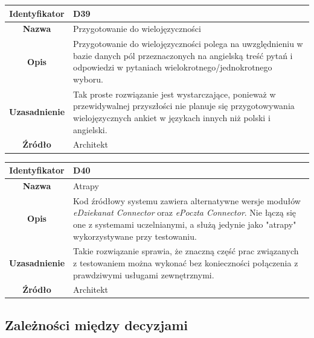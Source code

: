 \begin{table}[H]
\centering
\begin{tabular}{ | >{\bfseries}c | p{11cm} | }
\hline
%
Identyfikator & D39 \\ \hline
Nazwa & Przygotowanie do wielojęzyczności \\ \hline
Opis & Przygotowanie do wielojęzyczności polega na uwzględnieniu w bazie danych pól przeznaczonych na angielską treść pytań i odpowiedzi w pytaniach wielokrotnego/jednokrotnego wyboru. \\ \hline
Uzasadnienie & Tak proste rozwiązanie jest wystarczające, ponieważ w przewidywalnej przyszłości nie planuje się przygotowywania wielojęzycznych ankiet w językach innych niż polski i angielski. \\ \hline
Źródło & Architekt \\ \hline
%
\end{tabular}
\end{table}

\begin{table}[H]
\centering
\begin{tabular}{ | >{\bfseries}c | p{11cm} | }
\hline
%
Identyfikator & D40 \\ \hline
Nazwa & Atrapy \\ \hline
Opis & Kod źródłowy systemu zawiera alternatywne wersje modułów \textit{eDziekanat Connector} oraz \textit{ePoczta Connector}. Nie łączą się one z systemami uczelnianymi, a służą jedynie jako "atrapy" wykorzystywane przy testowaniu. \\ \hline
Uzasadnienie &  Takie rozwiązanie sprawia, że znaczną część prac związanych z testowaniem można wykonać bez konieczności połączenia z prawdziwymi usługami zewnętrznymi. \\ \hline
Źródło & Architekt \\ \hline
%
\end{tabular}
\end{table}

\subsection{Zależności między decyzjami}
\label{Chapter553}

